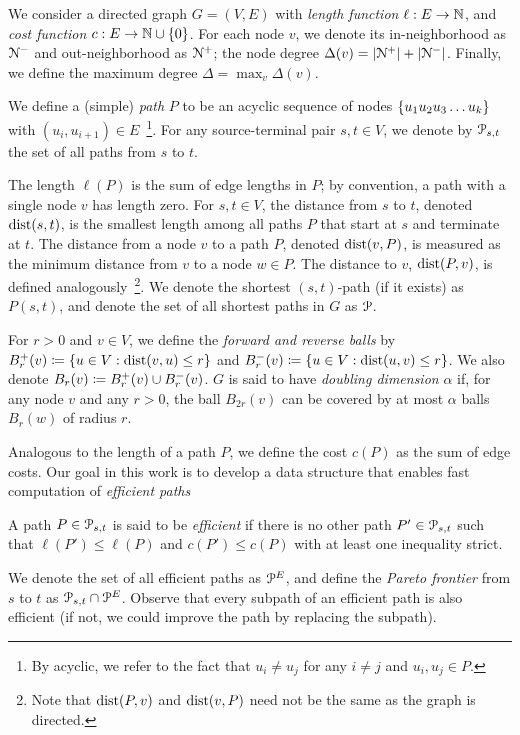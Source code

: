 
We consider a directed graph $G=(V,E)$ with \emph{length function} $\ell:E\to \N$, and \emph{cost function} $c:E\to \N\cup\{0\}$.
For each node $v$, we denote its in-neighborhood as $\Nb$ and out-neighborhood as $\Nf$; the node degree $\Delta(v) = |\Nf|+|\Nb|$.
Finally, we define the maximum degree $\Delta = \max_v\Delta(v)$.


We define a (simple) \emph{path} $P$ to be an acyclic sequence of nodes  $\crl*{u_1u_2u_3\ldots u_k}$ with $(u_i,u_{i+1})\in E$~\footnote{By acyclic, we refer to the fact that $u_i\neq u_j$ for any $i\neq j$ and $u_i,u_j\in P$.}. 
For any source-terminal pair $s,t\in V$, we denote by $\calP_{s,t}$ the set of all paths from $s$ to $t$.

The length $\ell(P)$ is the sum of edge lengths in $P$; by convention, a path with a single node $v$ has length zero.
For $s,t\in V$, the distance from $s$ to $t$, denoted $\dist(s,t)$, is the smallest length among all paths $P$ that start at $s$ and terminate at $t$.
The distance from a node $v$ to a path $P$, denoted $\dist(v,P)$, is measured as the minimum distance from $v$ to a node $w\in P$.
The distance to $v$, $\dist(P,v)$, is defined analogously~\footnote{Note that  $\dist(P,v)$ and  $\dist(v,P)$ need not be the same as the graph is directed.}.
We denote the shortest $(s,t)$-path (if it exists) as $P(s,t)$, and denote the set of all shortest paths in $G$ as $\calP$.



For $r>0$ and $v\in V$, we define the \emph{forward and reverse balls} by $\Bf_r(v)\defeq\{u\in V: \dist(v,u)\leq r\}$ and $\Bb_r(v)\defeq\{u\in V: \dist(u,v)\leq r\}$.
We also denote $B_r(v)\defeq\Bf_r(v)\cup\Bb_r(v)$.
$G$ is said to have \emph{doubling dimension} $\alpha$ if, for any node $v$ and any $r>0$, the ball $B_{2r}(v)$ can be covered by at most $\alpha$ balls $B_r(w)$ of radius $r$. 



Analogous to the length of a path $P$, we define the cost $c(P)$ as the sum of edge costs. 
Our goal in this work is to develop a data structure that enables fast computation of \emph{efficient paths}
\begin{definition}
A path $P\in \calP_{s,t}$ is said to be \emph{efficient} if there is no other path $P'\in \calP_{s,t}$ such that $\ell(P')\leq \ell(P)$ and $c(P')\leq c(P)$ with at least one inequality strict.
\end{definition}
We denote the set of all efficient paths as $\PE$, and define the \emph{Pareto frontier} from $s$ to $t$ as $\calP_{s,t}\cap\PE$.
Observe that every subpath of an efficient path is also efficient (if not, we could improve the path by replacing the subpath).

